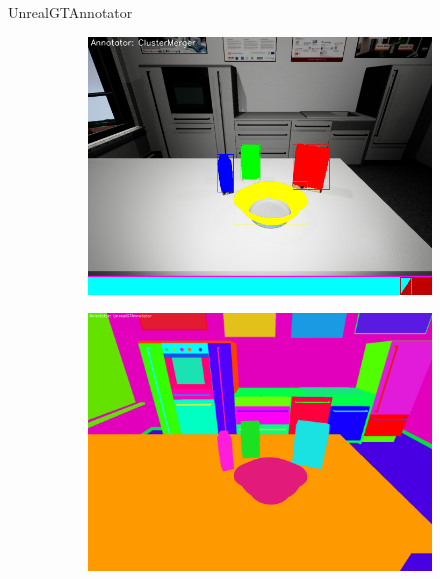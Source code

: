 \documentclass[]{beamer}
\begin{document}
\begin{frame}{UnrealGTAnnotator}
	\begin{figure}
\centering
	\begin{subfigure}[b]{0.3\textwidth}
		\includegraphics[scale=.16]{img/cluster.png}
	\end{subfigure}
	\quad
	\begin{subfigure}[b]{0.3\textwidth}
		\includegraphics[scale=.08]{img/objectImg.png}	
	\end{subfigure}
	\quad
	\begin{subfigure}[b]{0.3\textwidth}

\end{subfigure}
\end{figure}
\end{frame}
\end{document}
